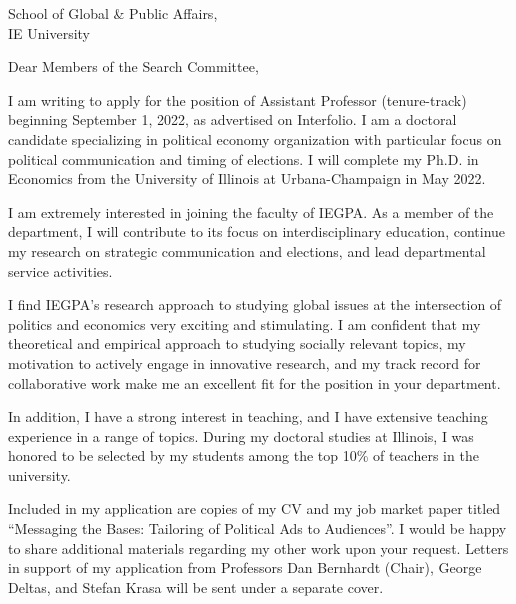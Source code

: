 \documentclass[12pt]{letter}
\begin{document}
\date{}
\begin{letter}{School of Global \& Public Affairs,\\
IE University}

\opening{Dear Members of the Search Committee,}

I am writing to apply for the position of Assistant Professor (tenure-track) beginning September 1, 2022, as advertised on Interfolio.
I am a doctoral candidate specializing in political economy organization with particular focus on political communication and timing of elections.
I will complete my Ph.D. in Economics from the University of Illinois at Urbana-Champaign in May 2022. 

I am extremely interested in joining the faculty of IEGPA.
As a member of the department, I will contribute to its focus on interdisciplinary education,
continue my research on strategic communication and elections, and lead departmental service activities.

I find IEGPA's research approach to studying global issues at the intersection of politics and economics very exciting and stimulating.
I am confident that my theoretical and empirical approach to studying socially relevant topics, 
my motivation to actively engage in innovative research, and my track record for collaborative work
make me an excellent fit for the position in your department. 


In addition, I have a strong interest in teaching, and I have extensive teaching experience in a range of topics.
During my doctoral studies at Illinois, I was honored to be selected by my students among the top 10\% of teachers in the university.


Included in my application are copies of my CV and my job market paper titled ``Messaging the Bases: Tailoring of Political Ads to Audiences''.
I would be happy to share additional materials regarding my other work upon your request.
Letters in support of my application from Professors Dan Bernhardt (Chair), George Deltas, and Stefan Krasa will be sent under a separate cover. 



\end{letter}
\end{document}
